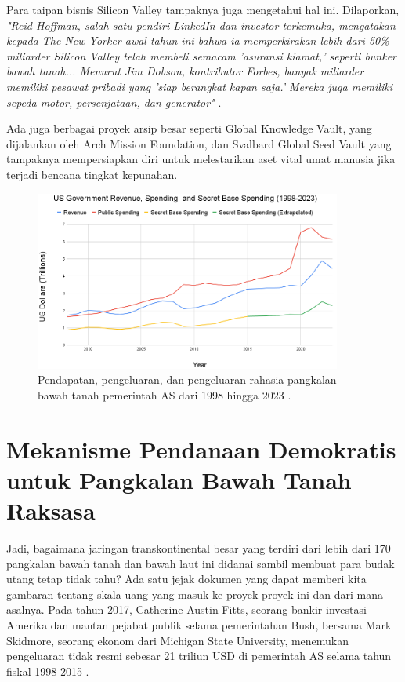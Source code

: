 \documentclass[10pt,twocolumn,letterpaper]{article}
\begin{document}
Para taipan bisnis Silicon Valley tampaknya juga mengetahui hal ini. Dilaporkan, \textit{"Reid Hoffman, salah satu pendiri LinkedIn dan investor terkemuka, mengatakan kepada The New Yorker awal tahun ini bahwa ia memperkirakan lebih dari 50\% miliarder Silicon Valley telah membeli semacam 'asuransi kiamat,' seperti bunker bawah tanah... Menurut Jim Dobson, kontributor Forbes, banyak miliarder memiliki pesawat pribadi yang 'siap berangkat kapan saja.' Mereka juga memiliki sepeda motor, persenjataan, dan generator"} \cite{28}.

Ada juga berbagai proyek arsip besar seperti Global Knowledge Vault, yang dijalankan oleh Arch Mission Foundation, \cite{29} dan Svalbard Global Seed Vault \cite{30} yang tampaknya mempersiapkan diri untuk melestarikan aset vital umat manusia jika terjadi bencana tingkat kepunahan.

\begin{figure}[t]
\begin{center}
\includegraphics[width=0.9\textwidth]{govcrop2.png}
\end{center}
   \caption{Pendapatan, pengeluaran, dan pengeluaran rahasia pangkalan bawah tanah pemerintah AS dari 1998 hingga 2023 \cite{19}.}
   \label{fig:9}
\end{figure}
\section{Mekanisme Pendanaan Demokratis untuk Pangkalan Bawah Tanah Raksasa}

Jadi, bagaimana jaringan transkontinental besar yang terdiri dari lebih dari 170 pangkalan bawah tanah dan bawah laut ini didanai sambil membuat para budak utang tetap tidak tahu? Ada satu jejak dokumen yang dapat memberi kita gambaran tentang skala uang yang masuk ke proyek-proyek ini dan dari mana asalnya. Pada tahun 2017, Catherine Austin Fitts, seorang bankir investasi Amerika dan mantan pejabat publik selama pemerintahan Bush, bersama Mark Skidmore, seorang ekonom dari Michigan State University, menemukan pengeluaran tidak resmi sebesar 21 triliun USD di pemerintah AS selama tahun fiskal 1998-2015 \cite{11,12,13}.
\end{document}
